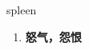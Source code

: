 
\begin{frame}
{\huge spleen}
\begin{center}
\begin{enumerate}\Large
  \item \textbf{怒气，怨恨}
\end{enumerate}
\end{center}
\end{frame}

